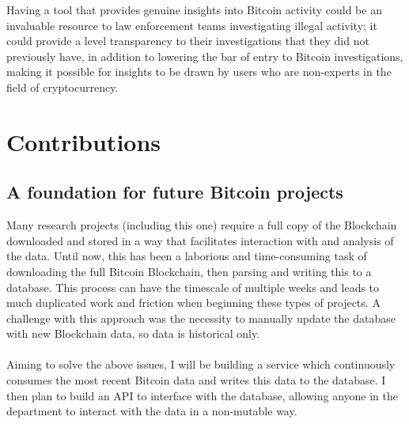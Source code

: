 Having a tool that provides genuine insights into Bitcoin activity could be an invaluable resource to law enforcement teams investigating illegal activity; it could provide a level transparency to their investigations that they did not previously have, in addition to lowering the bar of entry to Bitcoin investigations, making it possible for insights to be drawn by users who are non-experts in the field of cryptocurrency. 


\section{Contributions}


\subsection{A foundation for future Bitcoin projects}
Many research projects (including this one) require a full copy of the Blockchain downloaded and stored in a way that facilitates interaction with and analysis of the data. Until now, this has been a laborious and time-consuming task of downloading the full Bitcoin Blockchain, then parsing and writing this to a database. This process can have the timescale of multiple weeks and leads to much duplicated work and friction when beginning these types of projects. A challenge with this approach was the necessity to manually update the database with new Blockchain data, so data is historical only.
\\\\
Aiming to solve the above issues, I will be building a service which continuously consumes the most recent Bitcoin data and writes this data to the database. I then plan to build an API to interface with the database, allowing anyone in the department to interact with the data in a non-mutable way. 
           
 